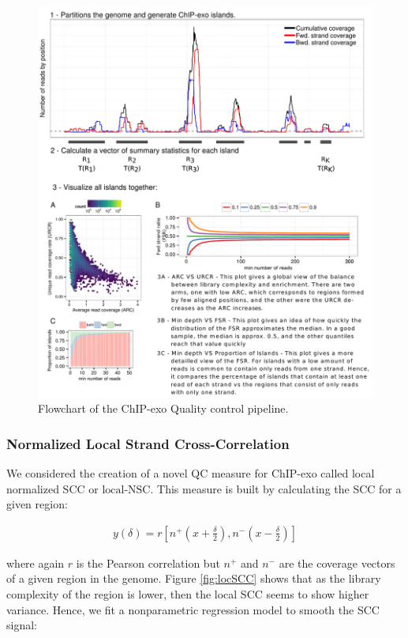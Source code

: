 \documentclass[11pt]{article}\usepackage[]{graphicx}\usepackage[]{color}
\begin{document}
\begin{figure}[h!]
  \centering
  \includegraphics[width = .7\textwidth]{../figs/for_paper/coverage_diagram2.pdf}
  \caption{Flowchart of the ChIP-exo Quality control pipeline.}
  \label{fig:qcdiagram}
\end{figure}

\subsubsection{Normalized Local Strand Cross-Correlation}
\label{sec:locNSC}

We considered the creation of a novel QC measure for ChIP-exo called
local normalized SCC or $\mbox{local-NSC}$. This measure is built by
calculating the SCC for a given region:

\begin{align}
  y(\delta) = r\left[ n^+ \left(x + \frac{\delta}{2}
    \right), n^- \left( x- \frac{\delta}{2} \right)\right]
\nonumber
\end{align}

where again $r$ is the Pearson correlation but $n^+$ and $n^-$ are the
coverage vectors of a given region in the genome. Figure
\ref{fig:locSCC} shows that as the library complexity of the region is
lower, then the local SCC seems to show higher variance. Hence, we
fit a nonparametric regression model to smooth the SCC signal:
\end{document}

